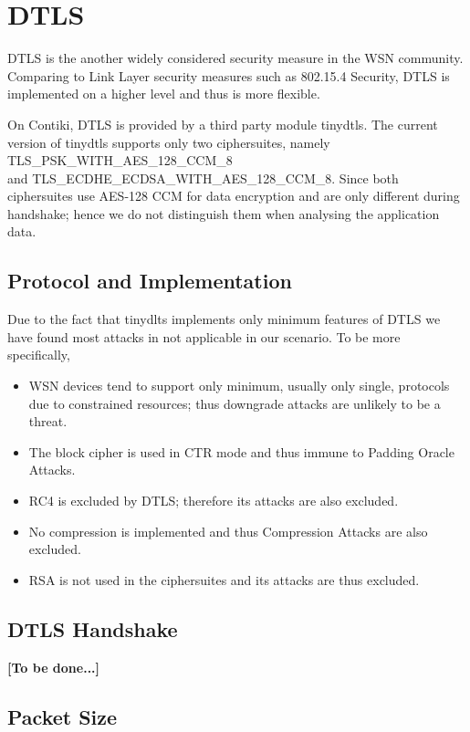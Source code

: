 \chapter{DTLS} \label{Chp: DTLS}

DTLS is the another widely considered security measure in the WSN community. Comparing to Link Layer security measures such as 802.15.4 Security, DTLS is implemented on a higher level and thus is more flexible. 

On Contiki, DTLS is provided by a third party module tinydtls. The current version of tinydtls supports only two ciphersuites, namely TLS\_PSK\_WITH\_AES\_128\_CCM\_8 \\
and TLS\_ECDHE\_ECDSA\_WITH\_AES\_128\_CCM\_8. Since both ciphersuites use AES-128 CCM for data encryption and are only different during handshake; hence we do not distinguish them when analysing the application data.

\section{Protocol and Implementation}

Due to the fact that tinydlts implements only minimum features of DTLS we have found most attacks in \cite{rfc7457} not applicable in our scenario. To be more specifically,

\begin{itemize}
	\item WSN devices tend to support only minimum, usually only single, protocols due to constrained resources; thus downgrade attacks are unlikely to be a threat.
	\item The block cipher is used in CTR mode and thus immune to Padding Oracle Attacks.
	\item RC4 is excluded by DTLS; therefore its attacks are also excluded.
	\item No compression is implemented and thus Compression Attacks are also excluded.
	\item RSA is not used in the ciphersuites and its attacks are thus excluded.
\end{itemize}

\section{DTLS Handshake}

\textbf{[To be done...]}

\section{Packet Size}

